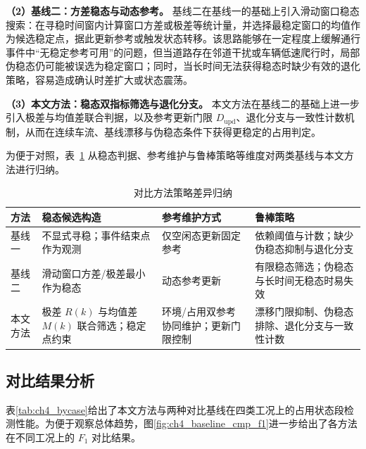 \documentclass{xdupgthesis}
\begin{document}
\textbf{（2）基线二：方差稳态与动态参考。}
基线二在基线一的基础上引入滑动窗口稳态搜索：在寻稳时间窗内计算窗口方差或极差等统计量，并选择最稳定窗口的均值作为候选稳定点，据此更新参考或触发状态转移。该思路能够在一定程度上缓解通行事件中“无稳定参考可用”的问题，但当道路存在邻道干扰或车辆低速爬行时，局部伪稳态仍可能被误选为稳定窗口；同时，当长时间无法获得稳态时缺少有效的退化策略，容易造成确认时差扩大或状态震荡。

\textbf{（3）本文方法：稳态双指标筛选与退化分支。}
本文方法在基线二的基础上进一步引入极差与均值差联合判据，以及参考更新门限 $D_{\mathrm{upd}}$、退化分支与一致性计数机制，从而在连续车流、基线漂移与伪稳态条件下获得更稳定的占用判定。

为便于对照，表~\ref{tab:ch4_baseline_summary} 从稳态判据、参考维护与鲁棒策略等维度对两类基线与本文方法进行归纳。

\begin{table}[!htbp]
\centering
\small
\caption{对比方法策略差异归纳}
\label{tab:ch4_baseline_summary}
\setlength{\tabcolsep}{5pt}
\renewcommand{\arraystretch}{1.18}
\begin{tabular}{p{2.1cm} p{4.2cm} p{4.5cm} p{4.6cm}}
\hline
方法 & 稳态候选构造 & 参考维护方式 & 鲁棒策略 \\
\hline
基线一 & 不显式寻稳；事件结束点作为观测 & 仅空闲态更新固定参考 & 依赖阈值与计数；缺少伪稳态抑制与退化分支 \\
基线二 & 滑动窗口方差/极差最小作为稳态 & 动态参考更新 & 有限稳态筛选；伪稳态与长时间无稳态时易失效 \\
本文方法 & 极差 $R(k)$ 与均值差 $M(k)$ 联合筛选；稳定点约束 & 环境/占用双参考协同维护；更新门限控制 & 漂移门限抑制、伪稳态排除、退化分支与一致性计数 \\
\hline
\end{tabular}
\end{table}

\subsection{对比结果分析}
\label{subsec:ch4_results}

表\ref{tab:ch4_bycase}给出了本文方法与两种对比基线在四类工况上的占用状态段检测性能。为便于观察总体趋势，图\ref{fig:ch4_baseline_cmp_f1}进一步给出了各方法在不同工况上的 $F_1$ 对比结果。
\end{document}
